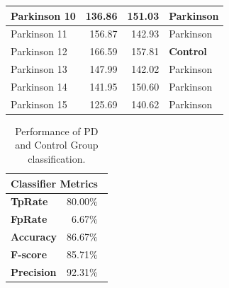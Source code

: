 \documentclass[10pt, conference, compsocconf]{IEEEtran}
\begin{document}
\begin{table}[!h]
\begin{tabular}{|l|l|l|l|}
Parkinson 10         & \multicolumn{1}{r|}{136.86}                                                          & \multicolumn{1}{r|}{151.03}                                                          & Parkinson                                                            \\ \hline
Parkinson 11         & \multicolumn{1}{r|}{156.87}                                                          & \multicolumn{1}{r|}{142.93}                                                          & Parkinson                                                            \\ \hline
Parkinson 12         & \multicolumn{1}{r|}{166.59}                                                          & \multicolumn{1}{r|}{157.81}                                                          & \textbf{Control}                                                            \\ \hline
Parkinson 13         & \multicolumn{1}{r|}{147.99}                                                          & \multicolumn{1}{r|}{142.02}                                                          & Parkinson                                                            \\ \hline
Parkinson 14         & \multicolumn{1}{r|}{141.95}                                                          & \multicolumn{1}{r|}{150.60}                                                          & Parkinson                                                            \\ \hline
Parkinson 15         & \multicolumn{1}{r|}{125.69}                                                          & \multicolumn{1}{r|}{140.62}                                                          & Parkinson                                                            
\\ \hline
\end{tabular}
\end{table}

\begin{table}[htbp!]
\caption{Performance of PD and Control Group classification.}
\label{table:metricas}
\centering
\begin{tabular}{|l|r|}
\hline
\multicolumn{2}{|l|}{\textbf{Classifier Metrics}} \\ \hline
\textbf{TpRate}                    & 80.00$\%$\                 \\ \hline
\textbf{FpRate}                    & 6.67$\%$\                \\ \hline
\textbf{Accuracy}                  & 86.67$\%$\                \\ \hline
\textbf{F-score}                   & 85.71$\%$\                \\ \hline
\textbf{Precision}                  & 92.31$\%$\                \\ \hline
\end{tabular}
\end{table}
\end{document}
